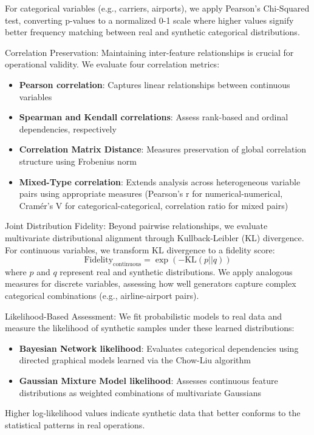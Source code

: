 \documentclass[conference]{IEEEtran}
\begin{document}
For categorical variables (e.g., carriers, airports), we apply Pearson's Chi-Squared test, converting p-values to a normalized 0-1 scale where higher values signify better frequency matching between real and synthetic categorical distributions.

Correlation Preservation:
Maintaining inter-feature relationships is crucial for operational validity. We evaluate four correlation metrics:
\begin{itemize}
    \item \textbf{Pearson correlation}: Captures linear relationships between continuous variables
    \item \textbf{Spearman and Kendall correlations}: Assess rank-based and ordinal dependencies, respectively
    \item \textbf{Correlation Matrix Distance}: Measures preservation of global correlation structure using Frobenius norm
    \item \textbf{Mixed-Type correlation}: Extends analysis across heterogeneous variable pairs using appropriate measures (Pearson's r for numerical-numerical, Cramér's V for categorical-categorical, correlation ratio for mixed pairs)
\end{itemize}

Joint Distribution Fidelity:
Beyond pairwise relationships, we evaluate multivariate distributional alignment through Kullback-Leibler (KL) divergence. For continuous variables, we transform KL divergence to a fidelity score:
\begin{equation}
\text{Fidelity}_{\text{continuous}} = \exp(-\text{KL}(p||q))
\end{equation}
where $p$ and $q$ represent real and synthetic distributions. We apply analogous measures for discrete variables, assessing how well generators capture complex categorical combinations (e.g., airline-airport pairs).

Likelihood-Based Assessment:
We fit probabilistic models to real data and measure the likelihood of synthetic samples under these learned distributions:
\begin{itemize}
    \item \textbf{Bayesian Network likelihood}: Evaluates categorical dependencies using directed graphical models learned via the Chow-Liu algorithm
    \item \textbf{Gaussian Mixture Model likelihood}: Assesses continuous feature distributions as weighted combinations of multivariate Gaussians
\end{itemize}
Higher log-likelihood values indicate synthetic data that better conforms to the statistical patterns in real operations.
\end{document}
